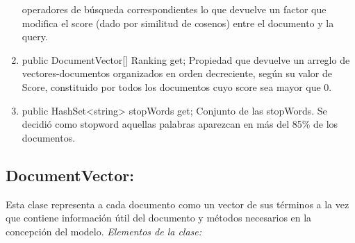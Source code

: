 \documentclass[a4paper,12pt]{article}
\begin{document}
\begin{enumerate}
        operadores de búsqueda correspondientes lo que devuelve un factor que modifica el
        score (dado por similitud de cosenos) entre el documento y la query.
    \item public DocumentVector[] Ranking { get;}
        Propiedad que devuelve un arreglo de vectores-documentos organizados en orden
        decreciente, según su valor de Score, constituido por todos los documentos cuyo score
        sea mayor que 0.
    \item public HashSet<string> stopWords { get;}
        Conjunto de las stopWords. Se decidió como stopword aquellas palabras aparezcan en
        más del 85\% de los documentos.
\end{enumerate}


\subsection{DocumentVector:}
Esta clase representa a cada documento como un vector de sus términos
a la vez que contiene información útil del documento y métodos necesarios en la concepción
del modelo.
\emph{Elementos de la clase:}
\end{document}
